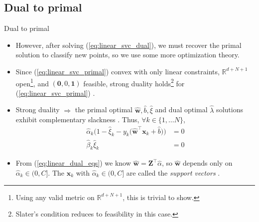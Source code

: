 \documentclass{beamer}
\numberwithin{equation}{section}
\newcommand{\aref}[1]{\alert{\ref{#1}}}
\begin{document}
\subsection{Dual to primal}

\begin{frame}{Dual to primal}
    \begin{itemize}
        \item
        However, after solving (\aref{eq:linear_svc_dual}), we must recover
        the primal solution to classify new points, so we use some more
        optimization theory.

        \item
        Since (\aref{eq:linear_svc_primal}) convex with only linear
        constraints, $ \mathbb{R}^{d + N + 1} $ open\footnote{
            Using any valid metric on $ \mathbb{R}^{d + N + 1} $, this is
            trivial to show.
        }, and
        $ (\mathbf{0}, 0, \mathbf{1}) $ feasible, strong duality
        holds\footnote{
            Slater's condition reduces to feasibility in this case.
        } for (\aref{eq:linear_svc_primal})
        \cite{bv_convex_opt}.

        \item
        Strong duality $ \Rightarrow $ the primal optimal $ \hat{\mathbf{w}},
        \hat{b}, \hat{\xi} $ and dual optimal $ \hat{\lambda} $ solutions
        exhibit complementary slackness \cite{bv_convex_opt}. Thus,
        $ \forall k \in \{1, \ldots N\} $,
        \begin{equation} \label{eq:dual_compl_slack}
            \begin{split}
                \hat{\alpha}_k\big(
                    1 - \hat{\xi}_k - y_k\big(
                        \hat{\mathbf{w}}^\top\mathbf{x}_k + \hat{b}
                    \big)
                \big) & = 0 \\
                \hat{\beta}_k\hat{\xi}_k & = 0
            \end{split}
        \end{equation}

        \item
        From (\aref{eq:linear_dual_eqs}) we know
        $ \hat{\mathbf{w}} = \mathbf{Z}^\top\hat{\alpha} $, so
        $ \hat{\mathbf{w}} $ depends only on $ \hat{\alpha}_k \in (0, C] $.
        The $ \mathbf{x}_k $ with $ \hat{\alpha}_k \in (0, C] $ are called 
        the \textit{support vectors} \cite{esl}.
    \end{itemize}

    \medskip
\end{frame}
\end{document}
